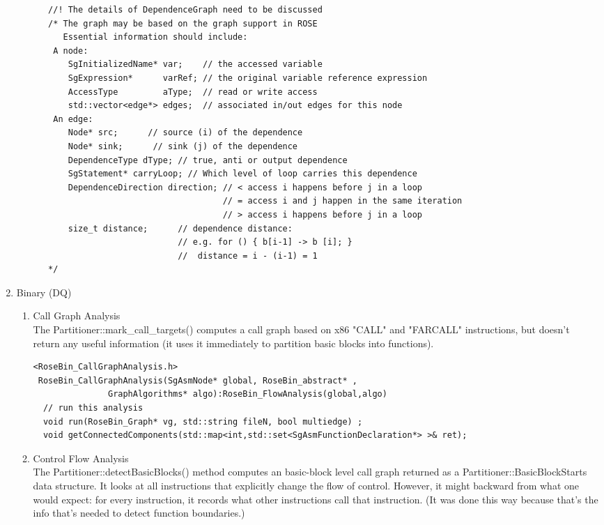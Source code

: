 \begin{enumerate}
\begin{enumerate}
\begin{lstlisting}
   //! The details of DependenceGraph need to be discussed
   /* The graph may be based on the graph support in ROSE
      Essential information should include:
    A node: 
       SgInitializedName* var;    // the accessed variable
       SgExpression*      varRef; // the original variable reference expression 
       AccessType         aType;  // read or write access
       std::vector<edge*> edges;  // associated in/out edges for this node
    An edge:
       Node* src;      // source (i) of the dependence
       Node* sink;      // sink (j) of the dependence
       DependenceType dType; // true, anti or output dependence
       SgStatement* carryLoop; // Which level of loop carries this dependence
       DependenceDirection direction; // < access i happens before j in a loop
                                      // = access i and j happen in the same iteration
                                      // > access i happens before j in a loop
       size_t distance;      // dependence distance: 
                             // e.g. for () { b[i-1] -> b [i]; } 
                             //  distance = i - (i-1) = 1
   */ 
   \end{lstlisting}

   \end{enumerate}

   \item Binary (DQ) \\
   \begin{enumerate}
      \item Call Graph Analysis \\
      The Partitioner::mark\_call\_targets() computes a call graph
      based on x86 "CALL" and "FARCALL" instructions, but doesn't
      return any useful information (it uses it immediately to
      partition basic blocks into functions).

      \begin{lstlisting}
<RoseBin_CallGraphAnalysis.h>
 RoseBin_CallGraphAnalysis(SgAsmNode* global, RoseBin_abstract* ,
			   GraphAlgorithms* algo):RoseBin_FlowAnalysis(global,algo) 
  // run this analysis
  void run(RoseBin_Graph* vg, std::string fileN, bool multiedge) ;
  void getConnectedComponents(std::map<int,std::set<SgAsmFunctionDeclaration*> >& ret);

      \end{lstlisting}

      \item Control Flow Analysis \\
      The Partitioner::detectBasicBlocks() method computes an
      basic-block level call graph returned as a
      Partitioner::BasicBlockStarts data structure. It looks at all
      instructions that explicitly change the flow of
      control. However, it might backward from what one would
      expect: for every instruction, it records what other
      instructions call that instruction. (It was done this way
      because that's the info that's needed to detect function
      boundaries.)


\end{enumerate}
\end{enumerate}
